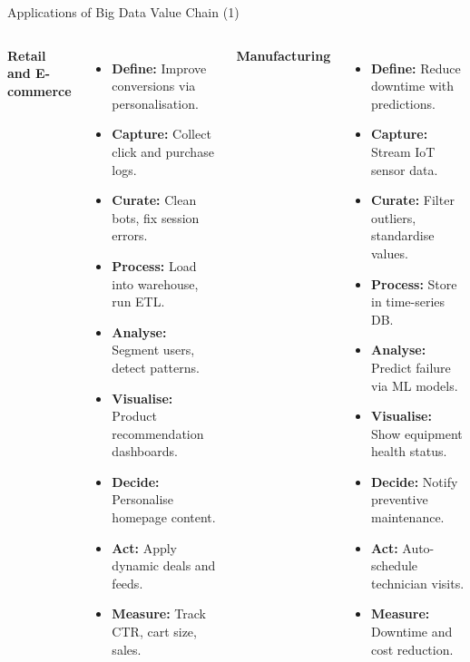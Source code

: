 \documentclass[aspectratio=169, table]{beamer}
\begin{document}
	
	\begin{frame}[fragile]{Applications of Big Data Value Chain (1)}
		\vspace{20pt}
		\small
		\begin{columns}[t]
			\textbf{Retail and E-commerce}
			\begin{itemize}
				\item \textbf{Define:} Improve conversions via personalisation.
				\item \textbf{Capture:} Collect click and purchase logs.
				\item \textbf{Curate:} Clean bots, fix session errors.
				\item \textbf{Process:} Load into warehouse, run ETL.
				\item \textbf{Analyse:} Segment users, detect patterns.
				\item \textbf{Visualise:} Product recommendation dashboards.
				\item \textbf{Decide:} Personalise homepage content.
				\item \textbf{Act:} Apply dynamic deals and feeds.
				\item \textbf{Measure:} Track CTR, cart size, sales.
			\end{itemize}
			
			\textbf{Manufacturing}
			\begin{itemize}
				\item \textbf{Define:} Reduce downtime with predictions.
				\item \textbf{Capture:} Stream IoT sensor data.
				\item \textbf{Curate:} Filter outliers, standardise values.
				\item \textbf{Process:} Store in time-series DB.
				\item \textbf{Analyse:} Predict failure via ML models.
				\item \textbf{Visualise:} Show equipment health status.
				\item \textbf{Decide:} Notify preventive maintenance.
				\item \textbf{Act:} Auto-schedule technician visits.
				\item \textbf{Measure:} Downtime and cost reduction.
			\end{itemize}
		\end{columns}
	\end{frame}
	
\end{document}

